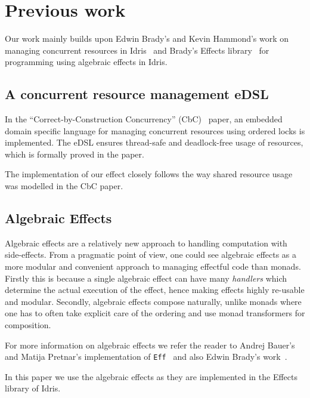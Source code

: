 \section{Previous work}

Our work mainly builds upon Edwin Brady's and Kevin Hammond's work on managing
concurrent resources in Idris~\cite{cbconc-fi} and Brady's Effects
library~\cite{effects-idr} for programming using algebraic effects in Idris.

\subsection{A concurrent resource management eDSL}

In the ``Correct-by-Construction Concurrency'' (CbC)~\cite{cbconc-fi} paper, an
embedded domain specific language for managing concurrent resources using
ordered locks is implemented. The eDSL ensures thread-safe and deadlock-free
usage of resources, which is formally proved in the paper.

The implementation of our effect closely follows the way shared resource usage
was modelled in the CbC paper.

\subsection{Algebraic Effects}

Algebraic effects are a relatively new approach to handling computation with
side-effects. From a pragmatic point of view, one could see algebraic effects
as a more modular and convenient approach to managing effectful code than
monads. Firstly this is because a single algebraic effect can have many
\emph{handlers} which determine the actual execution of the effect, hence
making effects highly re-usable and modular. Secondly, algebraic effects
compose naturally, unlike monads where one has to often take explicit care of
the ordering and use monad transformers for composition.

For more information on algebraic effects we refer the reader to Andrej Bauer's
and Matija Pretnar's implementation of \texttt{Eff}~\cite{eff} and also Edwin
Brady's work~\cite{effects-idr}.

In this paper we use the algebraic effects as they are implemented in the
Effects library of Idris.
